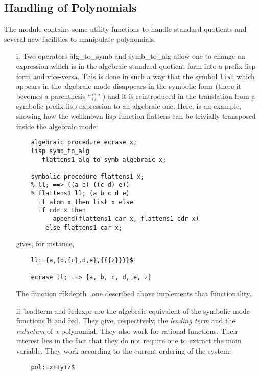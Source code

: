 \subsection{Handling of Polynomials}
The module contains some utility functions to handle
standard quotients and several new facilities to manipulate polynomials.
\begin{itemize}
\item[i.]
\hypertarget{operator:ALG_TO_SYMB}{}
\hypertarget{operator:SYMB_TO_ALG}{}
Two operators \f{alg\_to\_symb} and \f{symb\_to\_alg}
allow one to change an expression which is in the algebraic standard
quotient form into a prefix lisp form and vice-versa. This is done
in such a way that the symbol \texttt{list} which appears in the
algebraic mode disappears in the symbolic form (there it becomes
a parenthesis ``()'' ) and it is reintroduced in the translation
from a symbolic prefix lisp expression  to an algebraic one.
Here, is an example, showing how the wellknown lisp function
\f{flattens} can be trivially transposed inside the algebraic mode:
\begin{verbatim}
    algebraic procedure ecrase x;
    lisp symb_to_alg
       flattens1 alg_to_symb algebraic x;

    symbolic procedure flattens1 x;
    % ll; ==> ((a b) ((c d) e))
    % flattens1 ll; (a b c d e)
      if atom x then list x else
      if cdr x then
          append(flattens1 car x, flattens1 cdr x)
        else flattens1 car x;
\end{verbatim}
gives, for instance,
\begin{verbatim}
    ll:={a,{b,{c},d,e},{{{z}}}}$

    ecrase ll; ==> {a, b, c, d, e, z}
\end{verbatim}
The function \f{mkdepth\_one} described above implements that functionality.
\item[ii.]
\hypertarget{operator:LEADTERM}{}
\hypertarget{operator:REDEXPR}{}
\f{leadterm} and \f{redexpr} are the algebraic equivalent of the
symbolic mode functions \f{lt} and \f{red}. They give, respectively, the
\emph{leading term} and the \emph{reductum} of a polynomial. They also work
for rational functions. Their interest lies in the fact that they do not
require one to extract the main variable. They work according to the current
ordering of the system:
\begin{verbatim}
    pol:=x++y+z$


\end{verbatim}
\end{itemize}
